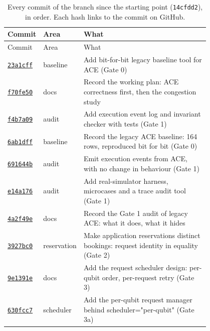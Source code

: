 {\scriptsize\setlength{\tabcolsep}{2.4pt}
\begin{longtable}{@{}lp{0.12\linewidth}p{0.68\linewidth}@{}}
\caption{Every commit of the branch since the starting point (\texttt{14cfdd2}), in order. Each hash links to the commit on GitHub.}\label{tab:timeline}\\
\toprule
Commit & Area & What \\
\midrule
\endfirsthead
\toprule
Commit & Area & What \\
\midrule
\endhead
\bottomrule
\endfoot
\href{https://github.com/sanjeevkrishnaa/Compiler-Driven-ACE/commit/23a1cff}{\texttt{23a1cff}} & baseline & Add bit-for-bit legacy baseline tool for ACE (Gate 0) \\
\href{https://github.com/sanjeevkrishnaa/Compiler-Driven-ACE/commit/f70fe50}{\texttt{f70fe50}} & docs & Record the working plan: ACE correctness first, then the congestion study \\
\href{https://github.com/sanjeevkrishnaa/Compiler-Driven-ACE/commit/f4b7a09}{\texttt{f4b7a09}} & audit & Add execution event log and invariant checker with tests (Gate 1) \\
\href{https://github.com/sanjeevkrishnaa/Compiler-Driven-ACE/commit/6ab1dff}{\texttt{6ab1dff}} & baseline & Record the legacy ACE baseline: 164 rows, reproduced bit for bit (Gate 0) \\
\href{https://github.com/sanjeevkrishnaa/Compiler-Driven-ACE/commit/691644b}{\texttt{691644b}} & audit & Emit execution events from ACE, with no change in behaviour (Gate 1) \\
\href{https://github.com/sanjeevkrishnaa/Compiler-Driven-ACE/commit/e14a176}{\texttt{e14a176}} & audit & Add real-simulator harness, microcases and a trace audit tool (Gate 1) \\
\href{https://github.com/sanjeevkrishnaa/Compiler-Driven-ACE/commit/4a2f49e}{\texttt{4a2f49e}} & docs & Record the Gate 1 audit of legacy ACE: what it does, what it hides \\
\href{https://github.com/sanjeevkrishnaa/Compiler-Driven-ACE/commit/3927bc0}{\texttt{3927bc0}} & reservation & Make application reservations distinct bookings: request identity in equality (Gate 2) \\
\href{https://github.com/sanjeevkrishnaa/Compiler-Driven-ACE/commit/9e1391e}{\texttt{9e1391e}} & docs & Add the request scheduler design: per-qubit order, per-request retry (Gate 3) \\
\href{https://github.com/sanjeevkrishnaa/Compiler-Driven-ACE/commit/630fcc7}{\texttt{630fcc7}} & scheduler & Add the per-qubit request manager behind scheduler="per-qubit" (Gate 3a) \\

\end{longtable}}
